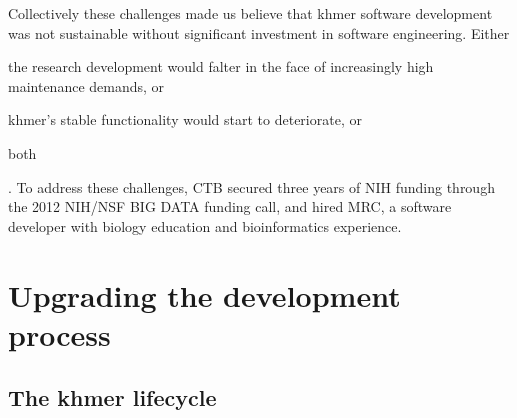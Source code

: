 \documentclass[12pt]{article}
\begin{document}
Collectively these challenges made us believe that khmer software
development was not sustainable without significant investment in
software engineering. Either \begin{inparaenum}[(1)] \item the
  research development would falter in the face of increasingly high
  maintenance demands, or \item khmer's stable functionality would
  start to deteriorate, or \item both\end{inparaenum}.  To address
  these challenges, CTB secured three years of NIH funding through the
  2012 NIH/NSF BIG DATA funding call, and hired MRC, a software developer
  with biology education and bioinformatics experience.





\section{Upgrading the development process}

\subsection{The khmer lifecycle}
\end{document}
